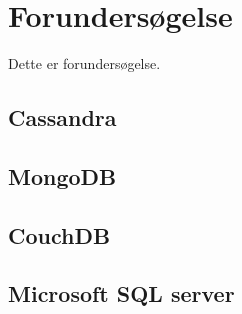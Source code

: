\section{Forundersøgelse}
Dette er forundersøgelse.
\subsection{Cassandra}
\subsection{MongoDB}
\subsection{CouchDB}
\subsection{Microsoft SQL server}